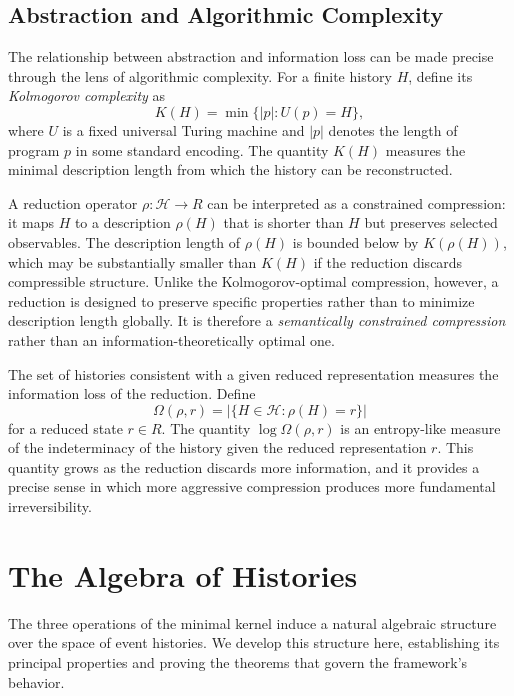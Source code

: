 \documentclass[12pt]{article}
\begin{document}
\subsection{Abstraction and Algorithmic Complexity}

The relationship between abstraction and information loss can be made precise through the lens of algorithmic complexity. For a finite history $H$, define its \emph{Kolmogorov complexity} as
\[
K(H) = \min \{ |p| : U(p) = H \},
\]
where $U$ is a fixed universal Turing machine and $|p|$ denotes the length of program $p$ in some standard encoding. The quantity $K(H)$ measures the minimal description length from which the history can be reconstructed.

A reduction operator $\rho : \mathcal{H} \rightarrow R$ can be interpreted as a constrained compression: it maps $H$ to a description $\rho(H)$ that is shorter than $H$ but preserves selected observables. The description length of $\rho(H)$ is bounded below by $K(\rho(H))$, which may be substantially smaller than $K(H)$ if the reduction discards compressible structure. Unlike the Kolmogorov-optimal compression, however, a reduction is designed to preserve specific properties rather than to minimize description length globally. It is therefore a \emph{semantically constrained compression} rather than an information-theoretically optimal one.

The set of histories consistent with a given reduced representation measures the information loss of the reduction. Define
\[
\Omega(\rho, r) = \left| \{ H \in \mathcal{H} : \rho(H) = r \} \right|
\]
for a reduced state $r \in R$. The quantity $\log \Omega(\rho, r)$ is an entropy-like measure of the indeterminacy of the history given the reduced representation $r$. This quantity grows as the reduction discards more information, and it provides a precise sense in which more aggressive compression produces more fundamental irreversibility.


\section{The Algebra of Histories}
\label{sec:algebra}

The three operations of the minimal kernel induce a natural algebraic structure over the space of event histories. We develop this structure here, establishing its principal properties and proving the theorems that govern the framework's behavior.
\end{document}
